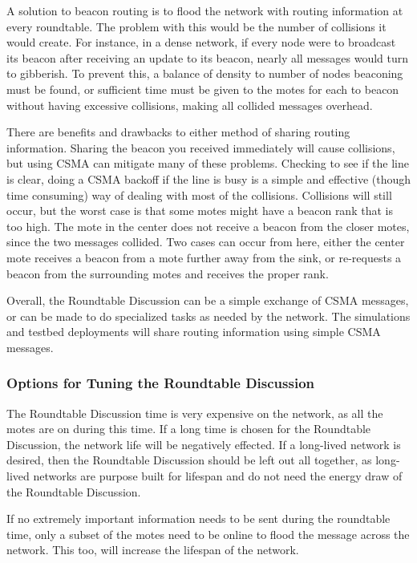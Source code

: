 A solution to  beacon routing is to flood the network with routing information at every roundtable.
The problem with this would be the number of collisions it would create.  For instance, in a dense network,
if every node were to broadcast its beacon after receiving an update to its beacon, nearly all messages would turn
to gibberish. To prevent this, a balance of density to number of nodes beaconing must be found, or sufficient time 
must be given to the motes for each to beacon without having excessive collisions, making all collided messages overhead.


There are benefits and drawbacks to either method of sharing routing information. Sharing the beacon you received immediately
will cause collisions, but using CSMA can mitigate many of these problems.
Checking to see if the line is clear, doing a CSMA backoff if the line is busy is a simple and effective (though time consuming) way of 
dealing with most of the collisions. Collisions will still  occur, but the worst case is that some motes
might have a beacon rank that is too high.
The mote in the center does not receive a beacon from the closer motes, since the two messages collided.
Two cases can occur from here, either the center mote receives a beacon from a mote further away
from the sink, or re-requests a beacon from the surrounding motes and receives the proper rank.

Overall, the Roundtable Discussion can be a simple exchange of CSMA messages, or can
be made to do specialized tasks as needed by the network. The simulations and testbed
deployments will share routing information using simple CSMA messages.


\subsubsection{Options for Tuning the Roundtable Discussion}
\label{implementationTuning}
The Roundtable Discussion time is very expensive on the network, as all the motes
are on during this time. If a long time is chosen for the Roundtable Discussion, the 
network life will be negatively effected. If a long-lived network is desired, then 
the Roundtable Discussion should be left out all together, as long-lived networks 
are purpose built for lifespan and do not need the energy draw of the Roundtable Discussion.

If no extremely important information needs to be sent during the roundtable time, only a subset of
the motes need to be online to flood the message across the network. This too, will increase the 
lifespan of the network.

